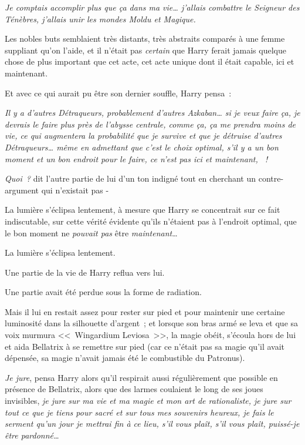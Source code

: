 \emph{Je comptais accomplir plus que ça dans ma vie… j'allais combattre le Seigneur des Ténèbres, j'allais unir les mondes Moldu et Magique.}

Les nobles buts semblaient très distants, très abstraits comparés à une femme suppliant qu'on l'aide, et il n'était pas \emph{certain} que Harry ferait jamais quelque chose de plus important que cet acte, cet acte unique dont il était capable, ici et maintenant.

Et avec ce qui aurait pu être son dernier souffle, Harry pensa~:

\emph{Il y a d'autres Détraqueurs, probablement d'autres Azkaban… si je veux faire ça, je devrais le faire plus près de l'abysse centrale, comme ça, ça me prendra moins de vie, ce qui augmentera la probabilité que je survive et que je détruise d'autres Détraqueurs… même en admettant que c'est le choix optimal, s'il y a un bon moment et un bon endroit pour le faire, ce n'est pas ici et maintenant, ~!}

\emph{Quoi~?} dit l'autre partie de lui d'un ton indigné tout en cherchant un contre-argument qui n'existait pas -

La lumière s'éclipsa lentement, à mesure que Harry se concentrait sur ce fait indiscutable, sur cette vérité évidente qu'ils n'étaient pas à l'endroit optimal, que le bon moment ne \emph{pouvait pas} être \emph{maintenant}…

La lumière s'éclipsa lentement.

Une partie de la vie de Harry reflua vers lui.

Une partie avait été perdue sous la forme de radiation.

Mais il lui en restait assez pour rester sur pied et pour maintenir une certaine luminosité dans la silhouette d'argent~; et lorsque son bras armé se leva et que sa voix murmura <<~Wingardium Leviosa~>>, la magie obéit, s'écoula hors de lui et aida Bellatrix à se remettre sur pied (car ce n'était pas sa magie qu'il avait dépensée, sa magie n'avait jamais été le combustible du Patronus).

\emph{Je jure}, pensa Harry alors qu'il respirait aussi régulièrement que possible en présence de Bellatrix, alors que des larmes coulaient le long de ses joues invisibles, \emph{je jure sur ma vie et ma magie et mon art de rationaliste, je jure sur tout ce que je tiens pour sacré et sur tous mes souvenirs heureux, je fais le serment qu'un jour je mettrai fin à ce lieu, s'il vous plaît, s'il vous plaît, puissé-je être pardonné…}

